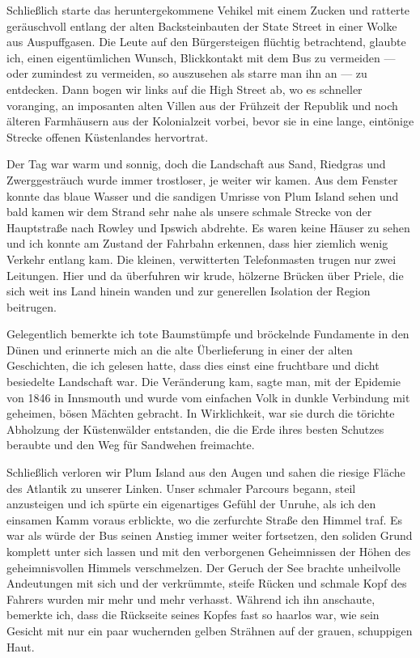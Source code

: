 Schließlich starte das heruntergekommene Vehikel mit einem Zucken und ratterte geräuschvoll entlang der alten Backsteinbauten der State Street in einer Wolke aus Auspuffgasen. Die Leute auf den Bürgersteigen flüchtig betrachtend, glaubte ich, einen eigentümlichen Wunsch, Blickkontakt mit dem Bus zu vermeiden --- oder zumindest zu vermeiden, so auszusehen als starre man ihn an --- zu entdecken. Dann bogen wir links auf die High Street ab, wo es schneller voranging, an imposanten alten Villen aus der Frühzeit der Republik und noch älteren Farmhäusern aus der Kolonialzeit vorbei, bevor sie in eine lange, eintönige Strecke offenen Küstenlandes hervortrat.

Der Tag war warm und sonnig, doch die Landschaft aus Sand, Riedgras und Zwerggesträuch wurde immer trostloser, je weiter wir kamen. Aus dem Fenster konnte das blaue Wasser und die sandigen Umrisse von Plum Island sehen und bald kamen wir dem Strand sehr nahe als unsere schmale Strecke von der Hauptstraße nach Rowley und Ipswich abdrehte. Es waren keine Häuser zu sehen und ich konnte am Zustand der Fahrbahn erkennen, dass hier ziemlich wenig Verkehr entlang kam. Die kleinen, verwitterten Telefonmasten trugen nur zwei Leitungen. Hier und da überfuhren wir krude, hölzerne Brücken über Priele, die sich weit ins Land hinein wanden und zur generellen Isolation der Region beitrugen.

Gelegentlich bemerkte ich tote Baumstümpfe und bröckelnde Fundamente in den Dünen und erinnerte mich an die alte Überlieferung in einer der alten Geschichten, die ich gelesen hatte, dass dies einst eine fruchtbare und dicht besiedelte Landschaft war. Die Veränderung kam, sagte man, mit der Epidemie von 1846 in Innsmouth und wurde vom einfachen Volk in dunkle Verbindung mit geheimen, bösen Mächten gebracht. In Wirklichkeit, war sie durch die törichte Abholzung der Küstenwälder entstanden, die die Erde ihres besten Schutzes beraubte und den Weg für Sandwehen freimachte.

Schließlich verloren wir Plum Island aus den Augen und sahen die riesige Fläche des Atlantik zu unserer Linken. Unser schmaler Parcours begann, steil anzusteigen und ich spürte ein eigenartiges Gefühl der Unruhe, als ich den einsamen Kamm voraus erblickte, wo die zerfurchte Straße den Himmel traf. Es war als würde der Bus seinen Anstieg immer weiter fortsetzen, den soliden Grund komplett unter sich lassen und mit den verborgenen Geheimnissen der Höhen des geheimnisvollen Himmels verschmelzen. Der Geruch der See brachte unheilvolle Andeutungen mit sich und der verkrümmte, steife Rücken und schmale Kopf des Fahrers wurden mir mehr und mehr verhasst. Während ich ihn anschaute, bemerkte ich, dass die Rückseite seines Kopfes fast so haarlos war, wie sein Gesicht mit nur ein paar wuchernden gelben Strähnen auf der grauen, schuppigen Haut.

